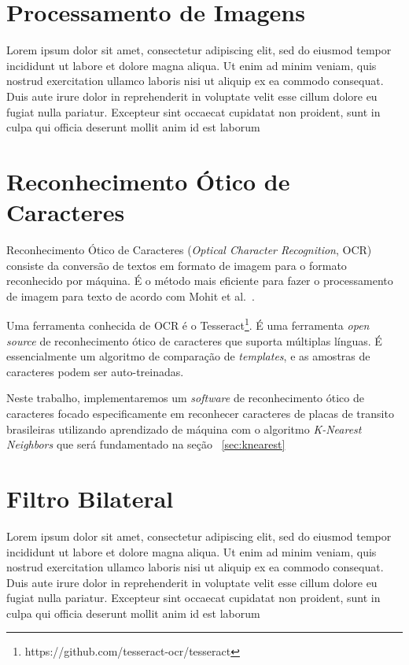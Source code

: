 \section{Processamento de Imagens}
\label{sec:processamentoimagens}

Lorem ipsum dolor sit amet, consectetur adipiscing elit, sed do eiusmod tempor incididunt ut labore et dolore magna aliqua. Ut enim ad minim veniam, quis nostrud exercitation ullamco laboris nisi ut aliquip ex ea commodo consequat. Duis aute irure dolor in reprehenderit in voluptate velit esse cillum dolore eu fugiat nulla pariatur. Excepteur sint occaecat cupidatat non proident, sunt in culpa qui officia deserunt mollit anim id est laborum

\section{Reconhecimento Ótico de Caracteres}
\label{sec:ocr}

Reconhecimento Ótico de Caracteres (\emph{Optical Character Recognition}, OCR)
consiste da conversão de textos em formato de imagem para o formato reconhecido
por máquina. É o método mais eficiente para fazer o processamento de imagem para
texto de acordo com Mohit et al.~\cite{mohit2015designing}.

Uma ferramenta conhecida de OCR é o
Tesseract\footnote{https://github.com/tesseract-ocr/tesseract}. É uma ferramenta
\emph{open source} de reconhecimento ótico de caracteres que suporta múltiplas
línguas.  É essencialmente um algoritmo de comparação de \emph{templates}, e as
amostras de caracteres podem ser auto-treinadas.~\cite{ho2016intelligent}

Neste trabalho, implementaremos um \emph{software} de reconhecimento ótico de caracteres focado especificamente em reconhecer caracteres de placas de transito brasileiras utilizando aprendizado de máquina com o algoritmo \emph{K-Nearest Neighbors} que será fundamentado na seção ~\ref{sec:knearest}

\section{Filtro Bilateral}
\label{sec:bilateralfilter}

Lorem ipsum dolor sit amet, consectetur adipiscing elit, sed do eiusmod tempor incididunt ut labore et dolore magna aliqua. Ut enim ad minim veniam, quis nostrud exercitation ullamco laboris nisi ut aliquip ex ea commodo consequat. Duis aute irure dolor in reprehenderit in voluptate velit esse cillum dolore eu fugiat nulla pariatur. Excepteur sint occaecat cupidatat non proident, sunt in culpa qui officia deserunt mollit anim id est laborum


